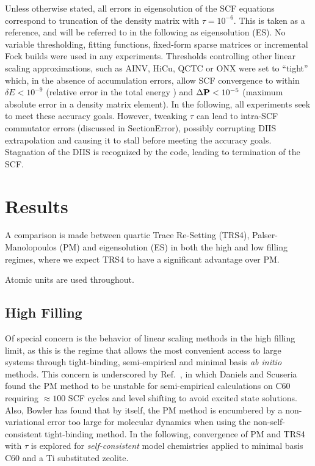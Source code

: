 \commentoutA{\documentclass[prb,aps,twocolumn,twocolumngrid,secnumarabic]{revtex4}}
\begin{document}
Unless otherwise stated, all errors in eigensolution of the SCF equations correspond to 
truncation of the density matrix with $\tau=10^{-6}$.  This is taken as a reference, and will be
referred to in the following as eigensolution (ES).  No variable thresholding, fitting functions,
fixed-form sparse matrices or incremental Fock builds were used in any experiments.  Thresholds 
controlling other linear scaling approximations, such as AINV, HiCu, QCTC or ONX were set to 
``tight''  which, in the absence of accumulation errors, allow SCF convergence to within 
$\delta E < 10^{-9}$ (relative error in the total energy ) and 
$\Delta{\bf P} < 10^{-5}$ (maximum absolute error in a density matrix element). In the following, all 
experiments seek to meet these accuracy goals.  However, tweaking $\tau$  can lead to intra-SCF commutator 
errors (discussed in Section{Error}), possibly corrupting DIIS extrapolation \cite{PPulay80,PPulay82} and 
causing it to stall before meeting the accuracy goals.  Stagnation of the DIIS is recognized by 
the code, leading to termination of the SCF.

\section{Results}

A comparison is made between quartic Trace Re-Setting (TRS4), Palser-Manolopoulos\cite{APalser99}  
(PM) and eigensolution (ES) in both the high and low filling regimes, where we expect TRS4 to have a 
significant advantage over PM.

\smallskip
Atomic units are used throughout. 

\subsection{High Filling}

Of special concern is the behavior of linear scaling methods in the high filling limit,
as this is the regime that allows the most convenient access to large systems through
tight-binding, semi-empirical and minimal basis {\em ab initio} methods.
This concern is underscored by Ref.~, in which Daniels and Scuseria 
found the PM method to be unstable for semi-empirical calculations on C60 requiring  
$\approx 100$ SCF cycles and level shifting to avoid excited state solutions.
Also, Bowler has found that by itself, the PM method is encumbered by a non-variational error 
too large for molecular dynamics when using the non-self-consistent tight-binding method\cite{DBowler99}.  
In the following,  convergence of PM and TRS4 with $\tau$ is explored for {\em self-consistent} model 
chemistries applied to minimal basis C60 and a Ti substituted zeolite.
\end{document}
